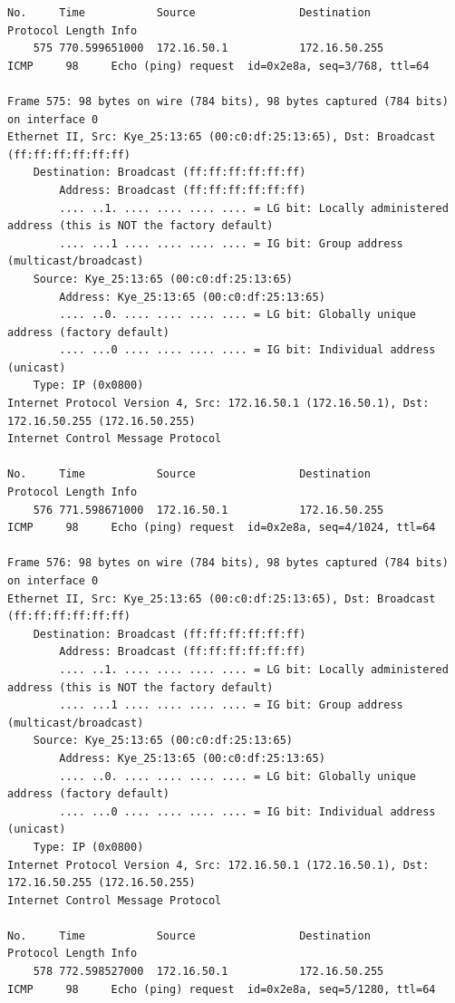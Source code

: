\documentclass[a4paper,11pt]{article}
\begin{document}
\begin{lstlisting}
No.     Time           Source                Destination           Protocol Length Info
    575 770.599651000  172.16.50.1           172.16.50.255         ICMP     98     Echo (ping) request  id=0x2e8a, seq=3/768, ttl=64

Frame 575: 98 bytes on wire (784 bits), 98 bytes captured (784 bits) on interface 0
Ethernet II, Src: Kye_25:13:65 (00:c0:df:25:13:65), Dst: Broadcast (ff:ff:ff:ff:ff:ff)
    Destination: Broadcast (ff:ff:ff:ff:ff:ff)
        Address: Broadcast (ff:ff:ff:ff:ff:ff)
        .... ..1. .... .... .... .... = LG bit: Locally administered address (this is NOT the factory default)
        .... ...1 .... .... .... .... = IG bit: Group address (multicast/broadcast)
    Source: Kye_25:13:65 (00:c0:df:25:13:65)
        Address: Kye_25:13:65 (00:c0:df:25:13:65)
        .... ..0. .... .... .... .... = LG bit: Globally unique address (factory default)
        .... ...0 .... .... .... .... = IG bit: Individual address (unicast)
    Type: IP (0x0800)
Internet Protocol Version 4, Src: 172.16.50.1 (172.16.50.1), Dst: 172.16.50.255 (172.16.50.255)
Internet Control Message Protocol

No.     Time           Source                Destination           Protocol Length Info
    576 771.598671000  172.16.50.1           172.16.50.255         ICMP     98     Echo (ping) request  id=0x2e8a, seq=4/1024, ttl=64

Frame 576: 98 bytes on wire (784 bits), 98 bytes captured (784 bits) on interface 0
Ethernet II, Src: Kye_25:13:65 (00:c0:df:25:13:65), Dst: Broadcast (ff:ff:ff:ff:ff:ff)
    Destination: Broadcast (ff:ff:ff:ff:ff:ff)
        Address: Broadcast (ff:ff:ff:ff:ff:ff)
        .... ..1. .... .... .... .... = LG bit: Locally administered address (this is NOT the factory default)
        .... ...1 .... .... .... .... = IG bit: Group address (multicast/broadcast)
    Source: Kye_25:13:65 (00:c0:df:25:13:65)
        Address: Kye_25:13:65 (00:c0:df:25:13:65)
        .... ..0. .... .... .... .... = LG bit: Globally unique address (factory default)
        .... ...0 .... .... .... .... = IG bit: Individual address (unicast)
    Type: IP (0x0800)
Internet Protocol Version 4, Src: 172.16.50.1 (172.16.50.1), Dst: 172.16.50.255 (172.16.50.255)
Internet Control Message Protocol

No.     Time           Source                Destination           Protocol Length Info
    578 772.598527000  172.16.50.1           172.16.50.255         ICMP     98     Echo (ping) request  id=0x2e8a, seq=5/1280, ttl=64


\end{lstlisting}
\end{document}
